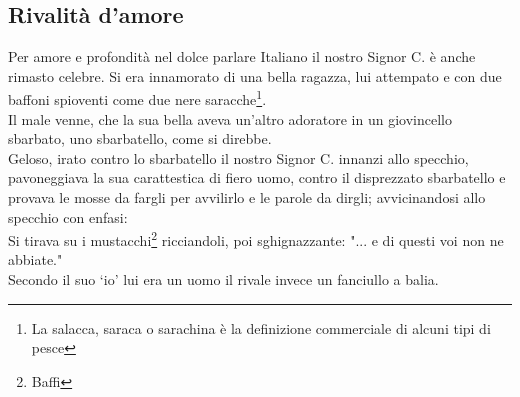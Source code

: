 \documentclass[10pt]{memoir} %
\begin{document}
\subsection{Rivalità d'amore}
Per amore e profondità nel dolce parlare Italiano il nostro Signor C. è anche rimasto celebre. Si era innamorato di una bella ragazza, lui attempato e con due baffoni spioventi come due nere saracche\footnote{La salacca, saraca o sarachina è la definizione commerciale di alcuni tipi di pesce}. \\
Il male venne, che la sua bella aveva un'altro adoratore in un giovincello sbarbato, uno sbarbatello, come si direbbe.\\
Geloso, irato contro lo sbarbatello il nostro Signor C. innanzi allo specchio, pavoneggiava la sua carattestica di fiero uomo, contro il disprezzato sbarbatello e provava le mosse da fargli per avvilirlo e le parole da dirgli; avvicinandosi allo specchio con enfasi:\\
Si tirava su i mustacchi\footnote{Baffi} ricciandoli, poi sghignazzante: "... e di questi voi non ne abbiate."\\
Secondo il suo ‘io' lui era un uomo il rivale invece un fanciullo a balia.


\end{document}
